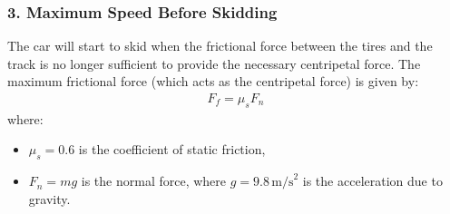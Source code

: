 \documentclass[letterpaper,10pt,english]{jupyterBook}
\begin{document}
\subsubsection{3. Maximum Speed Before Skidding}
\label{\detokenize{prerequisites:maximum-speed-before-skidding}}
\sphinxAtStartPar
The car will start to skid when the frictional force between the tires and the track is no longer sufficient to provide the necessary centripetal force. The maximum frictional force (which acts as the centripetal force) is given by:
\begin{equation*}
\begin{split}
F_f = \mu_s F_n
\end{split}
\end{equation*}
\sphinxAtStartPar
where:
\begin{itemize}
\item {} 
\sphinxAtStartPar
\(\mu_s = 0.6\) is the coefficient of static friction,

\item {} 
\sphinxAtStartPar
\(F_n = mg\) is the normal force, where \(g = 9.8 \, \text{m/s}^2\) is the acceleration due to gravity.

\end{itemize}
\end{document}
